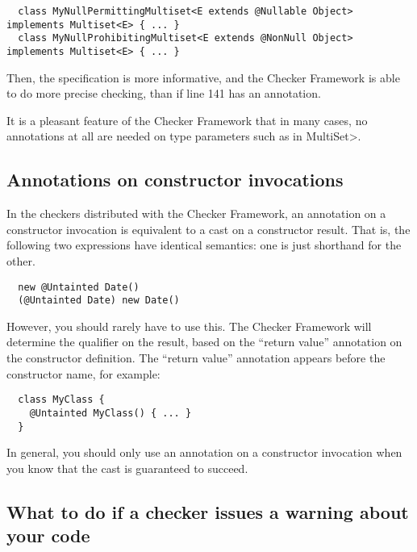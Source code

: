 \begin{Verbatim}
  class MyNullPermittingMultiset<E extends @Nullable Object> implements Multiset<E> { ... }
  class MyNullProhibitingMultiset<E extends @NonNull Object> implements Multiset<E> { ... }
\end{Verbatim}

Then, the specification is more informative, and the Checker Framework is
able to do more precise checking, than if line 141 has an annotation.

It is a pleasant feature of the Checker Framework that in many cases, no
annotations at all are needed on type parameters such as  in \<MultiSet>.


\subsection{Annotations on constructor invocations\label{annotations-on-constructor-invocations}}


In the checkers distributed with the Checker Framework, an annotation on a
constructor invocation is equivalent to a cast on a constructor result.
That is, the following two expressions have identical semantics:  one is
just shorthand for the other.

\begin{Verbatim}
  new @Untainted Date()
  (@Untainted Date) new Date()
\end{Verbatim}

However, you should rarely have to use this.  The Checker Framework will
determine the qualifier on the result, based on the ``return value''
annotation on the constructor definition.  The ``return value'' annotation
appears before the constructor name, for example:

\begin{Verbatim}
  class MyClass {
    @Untainted MyClass() { ... }
  }
\end{Verbatim}

In general, you should only use an annotation on a constructor invocation
when you know that the cast is
guaranteed to succeed.


\subsection{What to do if a checker issues a warning about your code\label{handling-warnings}}

